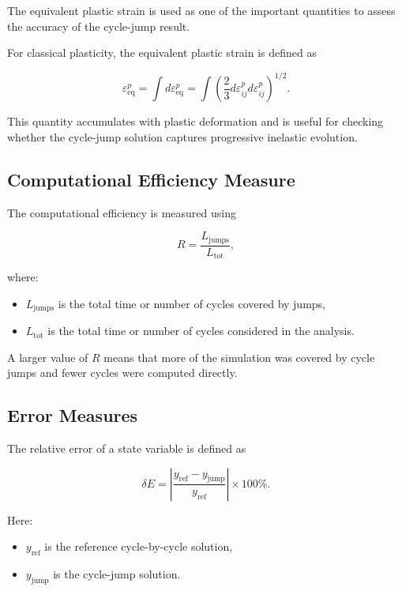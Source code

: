﻿\documentclass[11pt,a4paper]{article}
\begin{document}
The equivalent plastic strain is used as one of the important quantities to assess the accuracy of the cycle-jump result.

For classical plasticity, the equivalent plastic strain is defined as

\[
\varepsilon^p_{\mathrm{eq}}
=
\int d\varepsilon^p_{\mathrm{eq}}
=
\int
\left(
\frac{2}{3}
d\varepsilon^p_{ij}
d\varepsilon^p_{ij}
\right)^{1/2}.
\]

This quantity accumulates with plastic deformation and is useful for checking whether the cycle-jump solution captures progressive inelastic evolution.

\subsection{Computational Efficiency Measure}

The computational efficiency is measured using

\[
R =
\frac{L_{\mathrm{jumps}}}{L_{\mathrm{tot}}},
\]

where:

\begin{itemize}[leftmargin=*]
    \item $L_{\mathrm{jumps}}$ is the total time or number of cycles covered by jumps,
    \item $L_{\mathrm{tot}}$ is the total time or number of cycles considered in the analysis.
\end{itemize}

A larger value of $R$ means that more of the simulation was covered by cycle jumps and fewer cycles were computed directly.

\subsection{Error Measures}

The relative error of a state variable is defined as

\[
\delta E
=
\left|
\frac{
y_{\mathrm{ref}} - y_{\mathrm{jump}}
}{
y_{\mathrm{ref}}
}
\right|
\times 100 \%.
\]

Here:

\begin{itemize}[leftmargin=*]
    \item $y_{\mathrm{ref}}$ is the reference cycle-by-cycle solution,
    \item $y_{\mathrm{jump}}$ is the cycle-jump solution.
\end{itemize}
\end{document}
